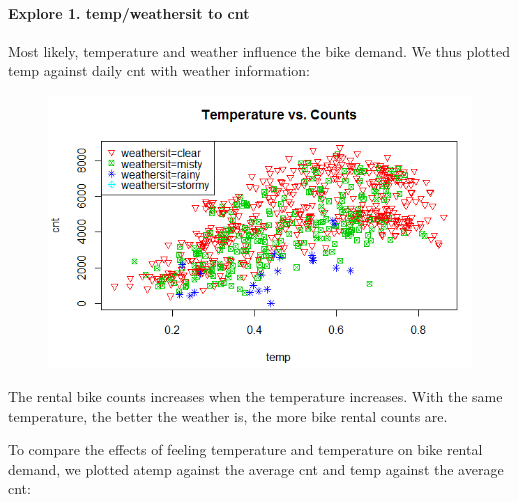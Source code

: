 \documentclass[12pt]{article}
\begin{document}
	\paragraph*{Explore 1. temp/weathersit to cnt} Most likely, temperature and weather influence the bike demand. We thus plotted temp against daily cnt with weather information:
	\begin{figure}[H]
		\centering
		\includegraphics[scale=.85]{figures/temp_counts.png}
	\end{figure}
	
	The rental bike counts increases when the temperature increases. With the same temperature, the better the weather is, the more bike rental counts are.
	
	To compare the effects of feeling temperature and temperature on bike rental demand, we plotted atemp against the average cnt and temp against the average cnt:
	
\end{document}

